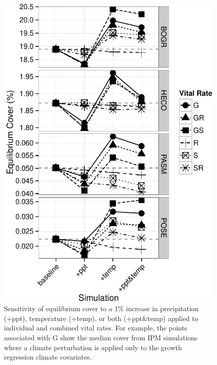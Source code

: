 \documentclass[12pt,]{article}
\begin{document}
\begin{figure}[htbp]
\centering
\includegraphics{components/figure/manuscript-figure_4.pdf}
\caption{Sensitivity of equilibrium cover to a 1\% increase in
precipitation (+ppt), temperature (+temp), or both (+ppt\&temp) applied
to individual and combined vital rates. For example, the points
associated with G show the median cover from IPM simulations where a
climate perturbation is applied only to the growth regression climate
covariates.}
\end{figure}
\end{document}
